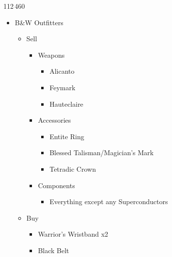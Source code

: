 \begin{paracol}{2}
	\begin{shop}{112\,460}
		\begin{itemize}
			\item B\&W Outfitters
			      \begin{itemize}
				      \item Sell
				            \begin{itemize}
					            \item Weapons
					                  \begin{itemize}
						                  \item Alicanto
						                  \item Feymark
						                  \item Hauteclaire
					                  \end{itemize}
					            \item Accessories
					                  \begin{itemize}
						                  \item Entite Ring
						                  \item Blessed Talisman/Magician's Mark
						                  \item Tetradic Crown
					                  \end{itemize}
					            \item Components
					                  \begin{itemize}
						                  \item Everything except any Superconductors
					                  \end{itemize}
				            \end{itemize}
				      \item Buy
				            \begin{itemize}
					            \item Warrior's Wristband x2
					            \item Black Belt
				            \end{itemize}
			      \end{itemize}


\end{itemize}
\end{shop}
\end{paracol}
